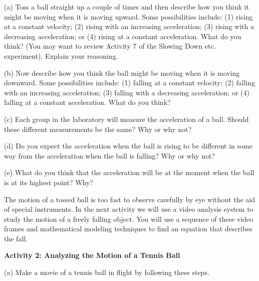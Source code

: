 (a) Toss a ball straight up a couple of times and then describe how you think
it might be moving when it is moving upward. Some possibilities include: (1)
rising at a constant velocity; (2) rising with an increasing acceleration; (3)
rising with a decreasing acceleration; or (4) rising at a constant acceleration. 
What do you think? (You may want to review Activity 7 of the Slowing Down etc. 
experiment). Explain your reasoning.
\vspace{20mm}

(b) Now describe how you think the ball might be moving when it is moving downward. Some possibilities include: (1) falling at a constant velocity; (2) falling
with an increasing acceleration; (3) falling with a decreasing acceleration;
or (4) falling at a constant acceleration. What do you think?
\vspace{20mm}

\newpage
(c) Each group in the laboratory will measure the acceleration of a ball. Should these different measurements be the same? Why or why not?
\vspace{20mm}

(d) Do you expect the acceleration when the ball is rising to be different in
some way from the acceleration when the ball is falling? Why or why not?
\vspace{20mm}

(e) What do you think that the acceleration will be at the moment when the ball
is at its highest point? Why?
\vspace{20mm}

The motion of a tossed ball is too fast to observe carefully by eye without
the aid of special instruments. In the next activity we will use a video analysis system to study the motion of a freely falling object. You will use a sequence of these video frames and mathematical modeling techniques to find an equation that describes the fall. 

\textbf{Activity 2: Analyzing the Motion of a Tennis Ball} 

(a) Make a movie of a tennis ball in flight by following these steps.

